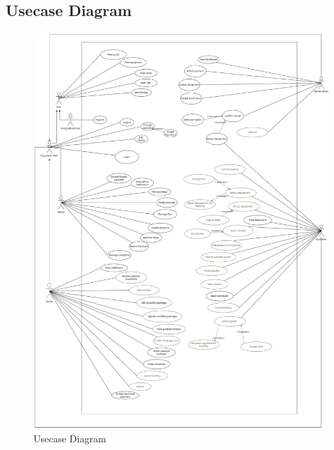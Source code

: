 \subsection{Usecase Diagram}
\begin{figure}[h!]
    \centering
    \includegraphics[scale=0.22]{Images/usecase.png}
    \caption{Usecase Diagram}
    \label{fig:usecase-diagram}
\end{figure}

\clearpage